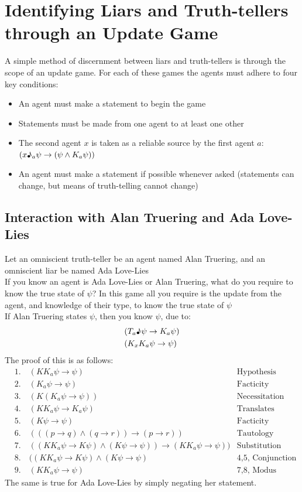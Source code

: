 \documentclass[12pt, titlepage, twoside, a4paper]{report}
\begin{document}
\section{Identifying Liars and Truth-tellers through an Update Game}
A simple method of discernment between liars and truth-tellers is through the scope of an update game. For each of these games the agents must adhere to four key conditions:
\begin{itemize}
\item An agent must make a statement to begin the game
\item Statements must be made from one agent to at least one other
\item The second agent $x$ is taken as a reliable source by the first agent $a$:\\
$(x\text{\textmusicalnote}_a \psi \to (\psi \wedge K_a \psi))$
\item An agent must make a statement if possible whenever asked (statements can change, but means of truth-telling cannot change)
\end{itemize}

\subsection{Interaction with Alan Truering and Ada Love-Lies}
Let an omniscient truth-teller be an agent named Alan Truering, and an omniscient liar be named Ada Love-Lies\\
If you know an agent is Ada Love-Lies or Alan Truering, what do you require to know the true state of $\psi$? In this game all you require is the update from the agent, and knowledge of their type, to know the true state of $\psi$\\
If Alan Truering states $\psi$, then you know $\psi$, due to:
\begin{align*}
&(T_a \text{\textmusicalnote} \psi \to K_a \psi)\\
&(K_x K_a \psi \to \psi)
\end{align*}
The proof of this is as follows:
\begin{align*}
&1. \quad (KK_a \psi \to \psi) \quad \quad 											&\text{Hypothesis}\\
&2. \quad (K_a \psi \to \psi) 														&\text{Facticity}\\
&3. \quad (K(K_a \psi \to \psi)) 													&\text{Necessitation}\\
&4. \quad (KK_a \psi \to K_a \psi) 													&\text{Translates across implication}\\
&5. \quad (K \psi \to \psi) 															&\text{Facticity}\\
&6. \quad (((p \to q) \wedge (q \to r)) \to (p \to r)) 								&\text{Tautology}\\
&7. \quad ((KK_a \psi \to K \psi) \wedge (K \psi \to \psi)) \to (KK_a \psi \to \psi)) 	&\text{Substitution}\\
&8. \quad ((KK_a \psi \to K \psi) \wedge (K \psi \to \psi) 							&\text{4,5, Conjunction}\\
&9. \quad (KK_a \psi \to \psi) &\text{7,8, Modus Ponens}
\end{align*}
The same is true for Ada Love-Lies by simply negating her statement.
\end{document}
